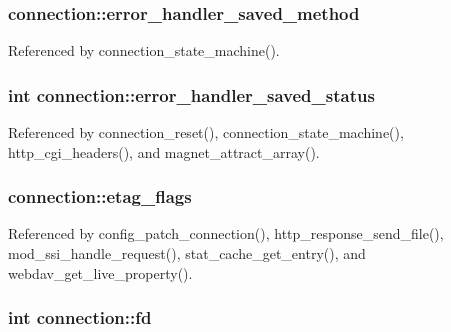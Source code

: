 \hypertarget{structconnection_ad631932dd50684e43436654946c5951f}{
\subsubsection[{error\-\_\-handler\-\_\-saved\-\_\-method}]{ connection\-::error\-\_\-handler\-\_\-saved\-\_\-method}}\label{structconnection_ad631932dd50684e43436654946c5951f}


Referenced by connection\-\_\-state\-\_\-machine().

\hypertarget{structconnection_a6dd3ddb643153f1d6e7946d1ac973135}{
\subsubsection[{error\-\_\-handler\-\_\-saved\-\_\-status}]{\setlength{\rightskip}{0pt plus 5cm}int connection\-::error\-\_\-handler\-\_\-saved\-\_\-status}}\label{structconnection_a6dd3ddb643153f1d6e7946d1ac973135}


Referenced by connection\-\_\-reset(), connection\-\_\-state\-\_\-machine(), http\-\_\-cgi\-\_\-headers(), and magnet\-\_\-attract\-\_\-array().

\hypertarget{structconnection_a2251cd32b04d7203e44954d944b589ce}{
\subsubsection[{etag\-\_\-flags}]{ connection\-::etag\-\_\-flags}}\label{structconnection_a2251cd32b04d7203e44954d944b589ce}


Referenced by config\-\_\-patch\-\_\-connection(), http\-\_\-response\-\_\-send\-\_\-file(), mod\-\_\-ssi\-\_\-handle\-\_\-request(), stat\-\_\-cache\-\_\-get\-\_\-entry(), and webdav\-\_\-get\-\_\-live\-\_\-property().

\hypertarget{structconnection_aa9a96cc6c66ef5a617f51247b2809a40}{
\subsubsection[{fd}]{\setlength{\rightskip}{0pt plus 5cm}int connection\-::fd}}\label{structconnection_aa9a96cc6c66ef5a617f51247b2809a40}


